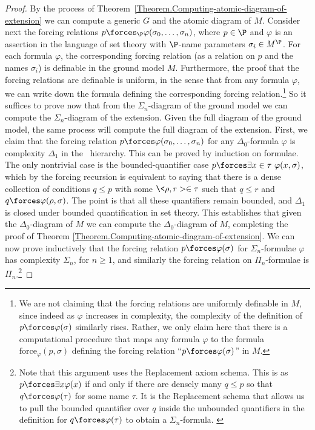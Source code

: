\documentclass{amsart}
\begin{document}
\begin{proof}
By the process of Theorem~\ref{Theorem.Computing-atomic-diagram-of-extension} we can compute a generic $G$ and the atomic diagram of $M$. Consider next the forcing relations $p\forces_\P\varphi(\sigma_0,\ldots,\sigma_n)$, where $p\in\P$ and $\varphi$ is an assertion in the language of set theory with $\P$-name parameters $\sigma_i\in M^\P$. For each formula $\varphi$, the corresponding forcing relation (as a relation on $p$ and the names $\sigma_i$) is definable in the ground model $M$. Furthermore, the proof that the forcing relations are definable is uniform, in the sense that from any formula $\varphi$, we can write down the formula defining the corresponding forcing relation.\footnote{We are not claiming that the forcing relations are uniformly definable in $M$, since indeed as $\varphi$ increases in complexity, the complexity of the definition of $p\forces\varphi(\sigma)$ similarly rises. Rather, we only claim here that there is a computational procedure that maps any formula $\varphi$ to the formula $\text{force}_\varphi(p,\sigma)$ defining the forcing relation ``$p\forces\varphi(\sigma)$'' in $M$.}
So it suffices to prove now that from the $\Sigma_n$-diagram of the ground model we can compute the $\Sigma_n$-diagram of the extension. Given the full diagram of the ground model, the same process will compute the full diagram of the extension.
First, we claim that the forcing relation $p \forces \varphi(\sigma_0, \ldots, \sigma_n)$ for any $\Delta_0$-formula $\varphi$ is complexity $\Delta_1$ in the \Levy\ hierarchy. This can be proved by induction on formulae. The only nontrivial case is the bounded-quantifier case $p\forces\exists x\in\tau\ \varphi(x,\sigma)$, which by the forcing recursion is equivalent to saying that there is a dense collection of conditions $q\leq p$ with some $\<\rho,r>\in\tau$ such that $q\leq r$ and $q\forces\varphi(\rho,\sigma)$. The point is that all these quantifiers remain bounded, and $\Delta_1$ is closed under bounded quantification in set theory. This establishes that given the $\Delta_0$-diagram of $M$ we can compute the $\Delta_0$-diagram of $M$, completing the proof of Theorem \ref{Theorem.Computing-atomic-diagram-of-extension}.
We can now prove inductively that the forcing relation $p\forces\varphi(\sigma)$ for $\Sigma_n$-formulae $\varphi$ has complexity $\Sigma_n$, for $n\geq 1$, and similarly the forcing relation on $\Pi_n$-formulae is $\Pi_n$.\footnote{Note that this argument uses the Replacement axiom schema. This is as $p \forces \exists x \varphi(x)$ if and only if there are densely many $q \le p$ so that $q \forces \varphi(\tau)$ for some name $\tau$. It is the Replacement schema that allows us to pull the bounded quantifier over $q$ inside the unbounded quantifiers in the definition for $q \forces \varphi(\tau)$ to obtain a $\Sigma_n$-formula. \label{Footnote.Replacement}}

\end{proof}
\end{document}
